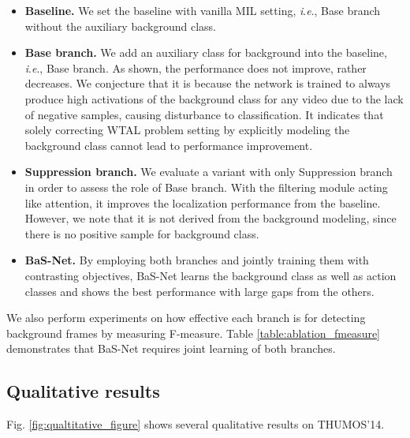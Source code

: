 \documentclass[letterpaper]{article} %
\newcommand{\ie}{\textit{i}.\textit{e}.}
\newcommand{\Fref}[1]{Fig. \ref{#1}}
\newcommand{\Tref}[1]{Table \ref{#1}}
\begin{document}
\begin{itemize}
    \item \textbf{Baseline.} We set the baseline with vanilla MIL setting, \ie, Base branch without the auxiliary background class.
    \item \textbf{Base branch.} We add an auxiliary class for background into the baseline, \ie, Base branch. As shown, the performance does not improve, rather decreases. We conjecture that it is because the network is trained to always produce high activations of the background class for any video due to the lack of negative samples, causing disturbance to classification. It indicates that solely correcting WTAL problem setting by explicitly modeling the background class cannot lead to performance improvement.
    \item \textbf{Suppression branch.} We evaluate a variant with only Suppression branch in order to assess the role of Base branch. With the filtering module acting like attention, it improves the localization performance from the baseline. However, we note that it is not derived from the background modeling, since there is no positive sample for background class.
    \item \textbf{BaS-Net.} By employing both branches and jointly training them with contrasting objectives, BaS-Net learns the background class as well as action classes and shows the best performance with large gaps from the others.
\end{itemize}

We also perform experiments on how effective each branch is for detecting background frames by measuring F-measure. \Tref{table:ablation_fmeasure} demonstrates that BaS-Net requires joint learning of both branches.

\subsection{Qualitative results}
\Fref{fig:qualtitative_figure} shows several qualitative results on THUMOS'14.
\end{document}
